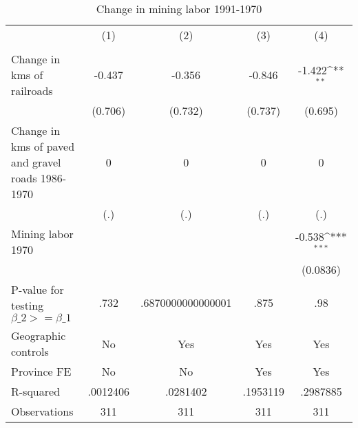 \begin{table}[htbp]\centering
\def\sym#1{\ifmmode^{#1}\else\(^{#1}\)\fi}
\caption{Change in mining labor 1991-1970}
\begin{tabular}{l*{4}{c}}
\hline\hline
                &\multicolumn{1}{c}{(1)}&\multicolumn{1}{c}{(2)}&\multicolumn{1}{c}{(3)}&\multicolumn{1}{c}{(4)}\\
                &\multicolumn{1}{c}{}&\multicolumn{1}{c}{}&\multicolumn{1}{c}{}&\multicolumn{1}{c}{}\\
\hline
Change in kms of railroads&   -0.437         &   -0.356         &   -0.846         &   -1.422\sym{**} \\
                &  (0.706)         &  (0.732)         &  (0.737)         &  (0.695)         \\
[1em]
Change in kms of paved and gravel roads 1986-1970&        0         &        0         &        0         &        0         \\
                &      (.)         &      (.)         &      (.)         &      (.)         \\
[1em]
Mining labor 1970&                  &                  &                  &   -0.538\sym{***}\\
                &                  &                  &                  & (0.0836)         \\
\hline
P-value for testing $\beta\_{2} >= \beta\_{1}$&     .732         &.6870000000000001         &     .875         &      .98         \\
Geographic controls&       No         &      Yes         &      Yes         &      Yes         \\
Province FE     &       No         &       No         &      Yes         &      Yes         \\
R-squared       & .0012406         & .0281402         & .1953119         & .2987885         \\
Observations    &      311         &      311         &      311         &      311         \\
\hline\hline
\end{tabular}
\end{table}
